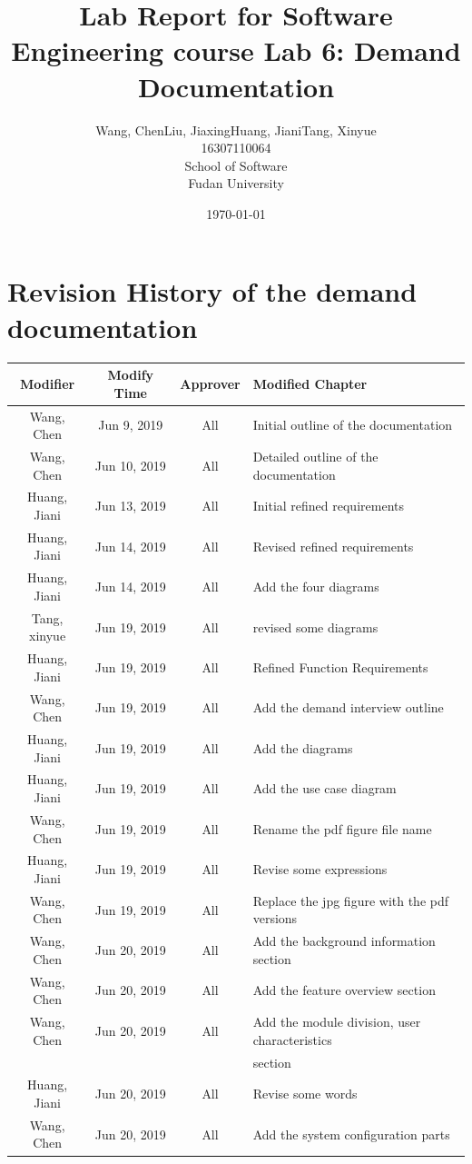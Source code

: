 \documentclass[a4paper]{report}
\title{Lab Report for Software Engineering course \newline
 Lab 6: Demand Documentation}
\author{Wang, Chen\qquad Liu, Jiaxing\qquad Huang, Jiani\qquad Tang, Xinyue \\
16307110064\qquad17302010049\qquad 17302010063\qquad 16307110476 \\
School of Software\\
Fudan University
}
\date{\today}
\begin{document}
\maketitle

\tableofcontents
\chapter{Revision History of the demand documentation}

\begin{tabular}{|c|c|c|l|}
\hline 
Modifier&Modify Time&Approver&Modified Chapter\\
\hline  
Wang, Chen&Jun 9, 2019&All&Initial outline of the documentation\\
\hline 
Wang, Chen&Jun 10, 2019&All&Detailed outline of the documentation\\
\hline 
Huang, Jiani&Jun 13, 2019&All&Initial refined requirements\\
\hline 
Huang, Jiani&Jun 14, 2019&All&Revised refined requirements\\
\hline 
Huang, Jiani&Jun 14, 2019&All&Add the four diagrams\\
\hline 
Tang, xinyue&Jun 19, 2019&All&revised some diagrams\\
\hline 
Huang, Jiani&Jun 19, 2019&All&Refined Function Requirements\\
\hline 
Wang, Chen&Jun 19, 2019&All&Add the demand interview outline\\
\hline
Huang, Jiani&Jun 19, 2019&All&Add the diagrams\\
\hline
Huang, Jiani&Jun 19, 2019&All&Add the use case diagram\\
\hline
Wang, Chen&Jun 19, 2019&All&Rename the pdf figure file name\\
\hline
Huang, Jiani&Jun 19, 2019&All&Revise some expressions\\
\hline
Wang, Chen&Jun 19, 2019&All&Replace the jpg figure with the pdf versions\\
\hline
Wang, Chen&Jun 20, 2019&All&Add the background information section\\
\hline
Wang, Chen&Jun 20, 2019&All&Add the feature overview section\\
\hline
Wang, Chen&Jun 20, 2019&All&Add the module division, user characteristics \\
& & & section\\
\hline
Huang, Jiani&Jun 20, 2019&All&Revise some words\\
\hline
Wang, Chen&Jun 20, 2019&All&Add the system configuration parts\\

\end{tabular}
\end{document}
